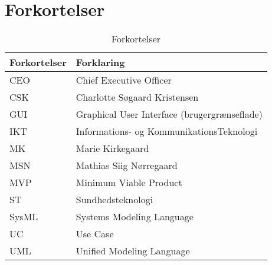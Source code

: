 \chapter{Forkortelser}
\begin{table}[h]
\centering
\begin{tabular}{|l| p{}|}
\hline
\textbf{Forkortelser} &  \textbf{Forklaring} \\\hline
CEO & Chief Executive Officer \\\hline
CSK & Charlotte Søgaard Kristensen \\\hline
GUI & Graphical User Interface (brugergrænseflade) \\\hline
IKT & Informations- og KommunikationsTeknologi \\\hline
MK & Marie Kirkegaard \\\hline
MSN & Mathias Siig Nørregaard \\\hline
MVP & Minimum Viable Product  \\\hline
ST  & Sundhedsteknologi \\\hline
SysML & Systems Modeling Language\\\hline
UC  & Use Case \\\hline
UML & Unified Modeling Language \\\hline
\end{tabular}
\caption{Forkortelser}
\end{table}

\vspace{5cm}